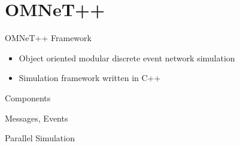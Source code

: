 \section{OMNeT++}
    
\begin{frame}{OMNeT++ Framework}
    \begin{itemize}
        \item Object oriented modular discrete event network simulation
        \item Simulation framework written in C++
    \end{itemize}
\end{frame}

\begin{frame}{Components}
\end{frame}

\begin{frame}{Messages, Events}
\end{frame}

\begin{frame}{Parallel Simulation}
\end{frame}